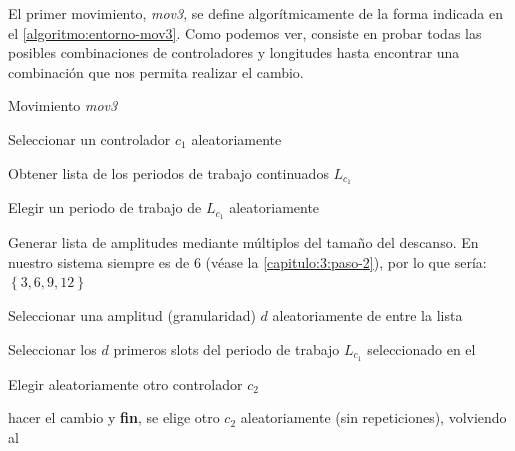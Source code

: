 El primer movimiento, \textit{mov3}, se define algorítmicamente de la forma indicada en el \autoref{algoritmo:entorno-mov3}. Como podemos ver, consiste en probar todas las posibles combinaciones de controladores y longitudes hasta encontrar una combinación que nos permita realizar el cambio.

\begin{algorithm}[h]
    \caption{Movimiento \textit{mov3}}
    \label{algoritmo:entorno-mov3}

    \SetAlgoNoLine
    \SetAlgoNoEnd
    \DontPrintSemicolon
    \LinesNumbered

    \bigskip


    Seleccionar un controlador $c_1$ aleatoriamente \; \label{line:c1}
    \algovspace

    Obtener lista de los periodos de trabajo continuados $L_{c_1}$
    \algovspace

    Elegir un periodo de trabajo de $L_{c_1}$ aleatoriamente \label{line:3} \;
    \algovspace

    Generar lista de amplitudes mediante múltiplos del tamaño del descanso. En nuestro sistema siempre es de 6 (véase la \autoref{capitulo:3:paso-2}), por lo que sería: $\left\lbrace 3,6,9,12\right\rbrace $ \;
    \algovspace

    Seleccionar una amplitud (granularidad) $d$ aleatoriamente de entre la lista \label{line:amplitud}\;
    \algovspace

    Seleccionar los $d$ primeros slots del periodo de trabajo $L_{c_1}$ seleccionado en el \; %
    \algovspace

    Elegir aleatoriamente otro controlador $c_2$ \label{line:c2}\;
    \algovspace

    {hacer el cambio y \textbf{fin}, }
    {se elige otro $c_2$ aleatoriamente (sin repeticiones), volviendo al }
    \algovspace

    \algovspace

    \algovspace

    \algovspace
\end{algorithm}


